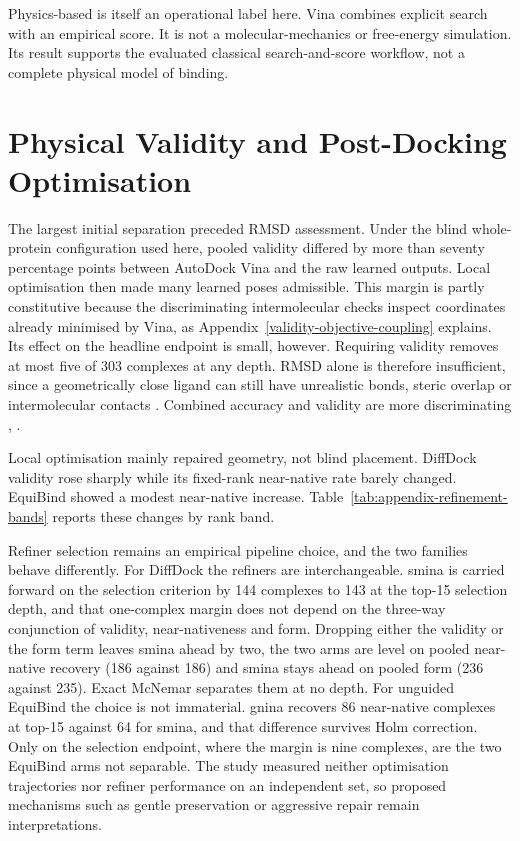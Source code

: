 Physics-based is itself an operational label here. Vina combines explicit search with an empirical score. It is not a molecular-mechanics or free-energy simulation. Its result supports the evaluated classical search-and-score workflow, not a complete physical model of binding.

\hypertarget{physical-validity-and-post-docking-optimisation}{%
\section{Physical Validity and Post-Docking Optimisation}\label{physical-validity-and-post-docking-optimisation}}

The largest initial separation preceded RMSD assessment. Under the blind whole-protein configuration used here, pooled validity differed by more than seventy percentage points between AutoDock Vina and the raw learned outputs. Local optimisation then made many learned poses admissible. This margin is partly constitutive because the discriminating intermolecular checks inspect coordinates already minimised by Vina, as Appendix~\ref{validity-objective-coupling} explains. Its effect on the headline endpoint is small, however. Requiring validity removes at most five of 303 complexes at any depth. RMSD alone is therefore insufficient, since a geometrically close ligand can still have unrealistic bonds, steric overlap or intermolecular contacts \cite{ref035}. Combined accuracy and validity are more discriminating \cite{ref013}, \cite{ref032}.

Local optimisation mainly repaired geometry, not blind placement. DiffDock validity rose sharply while its fixed-rank near-native rate barely changed. EquiBind showed a modest near-native increase. Table~\ref{tab:appendix-refinement-bands} reports these changes by rank band.

Refiner selection remains an empirical pipeline choice, and the two families behave differently. For DiffDock the refiners are interchangeable. smina is carried forward on the selection criterion by 144 complexes to 143 at the top-15 selection depth, and that one-complex margin does not depend on the three-way conjunction of validity, near-nativeness and form. Dropping either the validity or the form term leaves smina ahead by two, the two arms are level on pooled near-native recovery (186 against 186) and smina stays ahead on pooled form (236 against 235). Exact McNemar separates them at no depth. For unguided EquiBind the choice is not immaterial. gnina recovers 86 near-native complexes at top-15 against 64 for smina, and that difference survives Holm correction. Only on the selection endpoint, where the margin is nine complexes, are the two EquiBind arms not separable. The study measured neither optimisation trajectories nor refiner performance on an independent set, so proposed mechanisms such as gentle preservation or aggressive repair remain interpretations.

